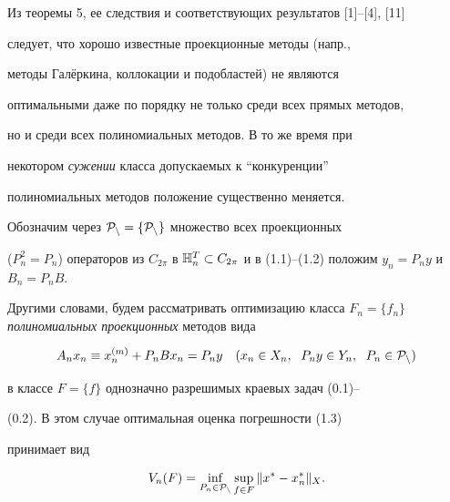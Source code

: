 Из теоремы 5, ее следствия и соответствующих результатов [1]--[4], [11]


следует, что хорошо известные проекционные методы (напр.,


методы Гал\"еркина, коллокации и подобластей) не являются


оптимальными даже по порядку не только среди всех прямых методов,


но и среди всех полиномиальных методов. В то же время при


некотором {\it сужении} класса допускаемых к ``конкуренции''


полиномиальных методов положение существенно меняется.





Обозначим через $\cal{P}_n = \{P_n\}$ множество всех проекционных


($P_n^2 = P_n$) операторов из $C_{2\pi}$ в $\bH_n^T\subset


C_{2\pi}$ и в (1.1)--(1.2) положим $y_n = P_n y$ и $B_n = P_n B$.


Другими словами, будем рассматривать оптимизацию класса $F_n =


\{f_n\}$ {\it полиномиальных проекционных} методов вида


\begin{equation}


A_nx_n \equiv x_n^{(m)} + P_nB x_n = P_ny \quad(x_n \in X_n,\ \;


P_ny\in Y_n,\ \; P_n\in \rP_n)


\end{equation}


в классе $F = \{f\}$ однозначно разрешимых краевых задач (0.1)--


(0.2). В этом случае оптимальная оценка погрешности (1.3)


принимает вид


\begin{equation}


V_n(F) = \inf\limits_{P_n\in \rP_n}\sup\limits_{f\in F}\|x^* -


x^*_n\|_X.


\end{equation}





